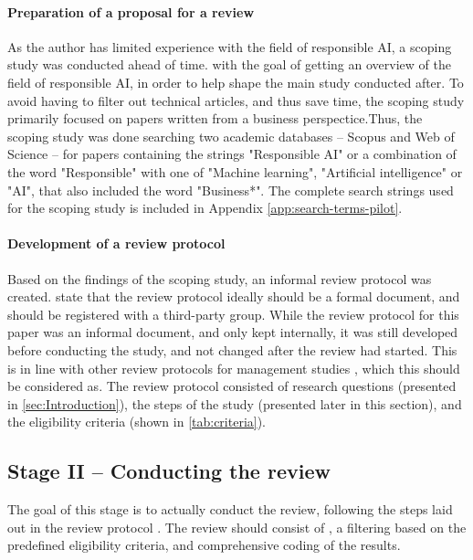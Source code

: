 \paragraph{Preparation of a proposal for a review}
As the author has limited experience with the field of responsible AI, a scoping study was conducted ahead of time. with the goal of getting an overview of the field of responsible AI, in order to help shape the main study conducted after. To avoid having to filter out technical articles, and thus save time, the scoping study primarily focused on papers written from a business perspectice.Thus, the scoping study was done searching two academic databases -- Scopus and Web of Science -- for papers containing the strings "Responsible AI" or a combination of the word "Responsible" with one of "Machine learning", "Artificial intelligence" or "AI", that also included the word "Business*". The complete search strings used for the scoping study is included in Appendix \ref{app:search-terms-pilot}.

\paragraph{Development of a review protocol}
Based on the findings of the scoping study, an informal review protocol was created. \textcite{Tranfield_2003} state that the review protocol ideally should be a formal document, and should be registered with a third-party group. While the review protocol for this paper was an informal document, and only kept internally, it was still developed before conducting the study, and not changed after the review had started. This is in line with other review protocols for management studies \parencite{Tranfield_2003}, which this should be considered as. The review protocol consisted of research questions (presented in \autoref{sec:Introduction}), the steps of the study (presented later in this section), and the eligibility criteria (shown in \autoref{tab:criteria}).

\subsection{Stage II -- Conducting the review}
\label{sec:method-stage2}
The goal of this stage is to actually conduct the review, following the steps laid out in the review protocol \parencite{Tranfield_2003}. The review should consist of  \parencite[p.~215]{Tranfield_2003}, a filtering based on the predefined eligibility criteria, and comprehensive coding of the results.


